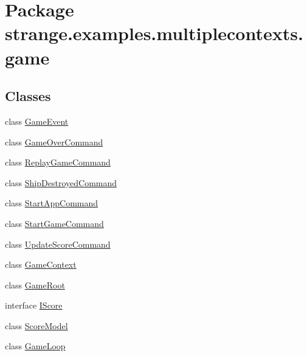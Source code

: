 \hypertarget{namespacestrange_1_1examples_1_1multiplecontexts_1_1game}{\section{Package strange.\-examples.\-multiplecontexts.\-game}
\label{namespacestrange_1_1examples_1_1multiplecontexts_1_1game}
}
\subsection*{Classes}
\begin{DoxyCompactItemize}
\item 
class \hyperlink{classstrange_1_1examples_1_1multiplecontexts_1_1game_1_1_game_event}{Game\-Event}
\item 
class \hyperlink{classstrange_1_1examples_1_1multiplecontexts_1_1game_1_1_game_over_command}{Game\-Over\-Command}
\item 
class \hyperlink{classstrange_1_1examples_1_1multiplecontexts_1_1game_1_1_replay_game_command}{Replay\-Game\-Command}
\item 
class \hyperlink{classstrange_1_1examples_1_1multiplecontexts_1_1game_1_1_ship_destroyed_command}{Ship\-Destroyed\-Command}
\item 
class \hyperlink{classstrange_1_1examples_1_1multiplecontexts_1_1game_1_1_start_app_command}{Start\-App\-Command}
\item 
class \hyperlink{classstrange_1_1examples_1_1multiplecontexts_1_1game_1_1_start_game_command}{Start\-Game\-Command}
\item 
class \hyperlink{classstrange_1_1examples_1_1multiplecontexts_1_1game_1_1_update_score_command}{Update\-Score\-Command}
\item 
class \hyperlink{classstrange_1_1examples_1_1multiplecontexts_1_1game_1_1_game_context}{Game\-Context}
\item 
class \hyperlink{classstrange_1_1examples_1_1multiplecontexts_1_1game_1_1_game_root}{Game\-Root}
\item 
interface \hyperlink{interfacestrange_1_1examples_1_1multiplecontexts_1_1game_1_1_i_score}{I\-Score}
\item 
class \hyperlink{classstrange_1_1examples_1_1multiplecontexts_1_1game_1_1_score_model}{Score\-Model}
\item 
class \hyperlink{classstrange_1_1examples_1_1multiplecontexts_1_1game_1_1_game_loop}{Game\-Loop}
\item 

\end{DoxyCompactItemize}
